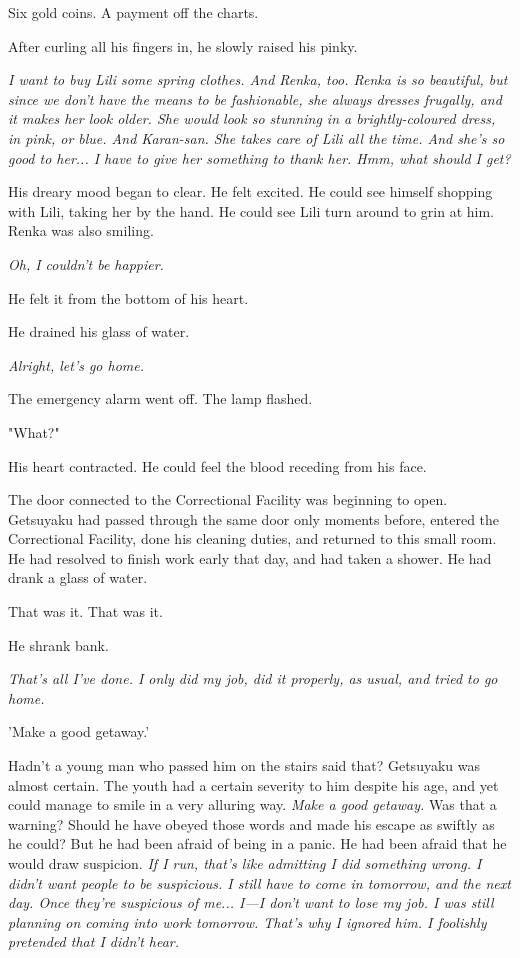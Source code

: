 Six gold coins. A payment off the charts.

After curling all his fingers in, he slowly raised his pinky.

\emph{I want to buy Lili some spring clothes. And Renka, too. Renka is so
beautiful, but since we don't have the means to be fashionable, she
always dresses frugally, and it makes her look older. She would look so
stunning in a brightly-coloured dress, in pink, or blue. And Karan-san.
She takes care of Lili all the time. And she's so good to her... I have
to give her something to thank her. Hmm, what should I get?}

His dreary mood began to clear. He felt excited. He could see himself
shopping with Lili, taking her by the hand. He could see Lili turn
around to grin at him. Renka was also smiling.

\emph{Oh, I couldn't be happier.}

He felt it from the bottom of his heart.

He drained his glass of water.

\emph{Alright, let's go home.}

The emergency alarm went off. The lamp flashed.

"What?"

His heart contracted. He could feel the blood receding from his face.

The door connected to the Correctional Facility was beginning to open.
Getsuyaku had passed through the same door only moments before, entered
the Correctional Facility, done his cleaning duties, and returned to
this small room. He had resolved to finish work early that day, and had
taken a shower. He had drank a glass of water.

That was it. That was it.

He shrank bank.

\emph{That's all I've done. I only did my job, did it properly, as usual, and
tried to go home.}

'Make a good getaway.'

Hadn't a young man who passed him on the stairs said that? Getsuyaku was
almost certain. The youth had a certain severity to him despite his age,
and yet could manage to smile in a very alluring way. \emph{Make a good
getaway.} Was that a warning? Should he have obeyed those words and made
his escape as swiftly as he could? But he had been afraid of being in a
panic. He had been afraid that he would draw suspicion. \emph{If I run, that's
like admitting I did something wrong. I didn't want people to be
suspicious. I still have to come in tomorrow, and the next day. Once
they're suspicious of me... I---I don't want to lose my job. I was still
planning on coming into work tomorrow. That's why I ignored him. I
foolishly pretended that I didn't hear.}

